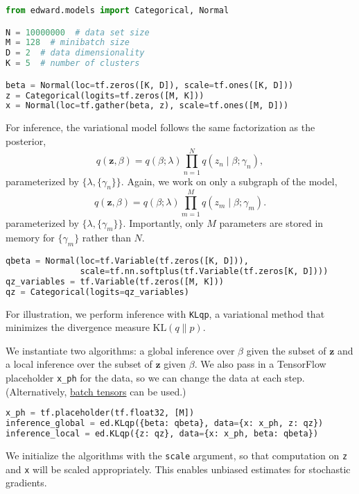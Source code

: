 \begin{lstlisting}[language=Python]
from edward.models import Categorical, Normal

N = 10000000  # data set size
M = 128  # minibatch size
D = 2  # data dimensionality
K = 5  # number of clusters

beta = Normal(loc=tf.zeros([K, D]), scale=tf.ones([K, D]))
z = Categorical(logits=tf.zeros([M, K]))
x = Normal(loc=tf.gather(beta, z), scale=tf.ones([M, D]))
\end{lstlisting}

For inference, the variational model follows the same factorization as
the posterior,
\begin{equation*}
q(\mathbf{z}, \beta) =
q(\beta; \lambda) \prod_{n=1}^N q(z_n \mid \beta; \gamma_n),
\end{equation*}
parameterized by $\{\lambda, \{\gamma_n\}\}$.
Again, we work on only a subgraph of the model,
\begin{equation*}
q(\mathbf{z}, \beta) =
q(\beta; \lambda) \prod_{m=1}^M q(z_m \mid \beta; \gamma_m).
\end{equation*}
parameterized by $\{\lambda, \{\gamma_m\}\}$. Importantly, only $M$
parameters are stored in memory for $\{\gamma_m\}$ rather than $N$.

\begin{lstlisting}[language=Python]
qbeta = Normal(loc=tf.Variable(tf.zeros([K, D])),
               scale=tf.nn.softplus(tf.Variable(tf.zeros[K, D])))
qz_variables = tf.Variable(tf.zeros([M, K]))
qz = Categorical(logits=qz_variables)
\end{lstlisting}

For illustration, we perform inference with \texttt{KLqp}, a variational method
that minimizes the divergence measure $\text{KL}(q\| p)$.

We instantiate two algorithms: a global inference over $\beta$ given
the subset of $\mathbf{z}$ and a local inference over the subset of
$\mathbf{z}$ given $\beta$.
We also pass in a TensorFlow placeholder \texttt{x_ph} for the data,
so we can change the data at each step. (Alternatively,
\href{/api/data}{batch tensors} can be used.)

\begin{lstlisting}[language=Python]
x_ph = tf.placeholder(tf.float32, [M])
inference_global = ed.KLqp({beta: qbeta}, data={x: x_ph, z: qz})
inference_local = ed.KLqp({z: qz}, data={x: x_ph, beta: qbeta})
\end{lstlisting}

We initialize the algorithms with the \texttt{scale} argument, so that
computation on \texttt{z} and \texttt{x} will be scaled appropriately.
This enables unbiased estimates for stochastic gradients.

